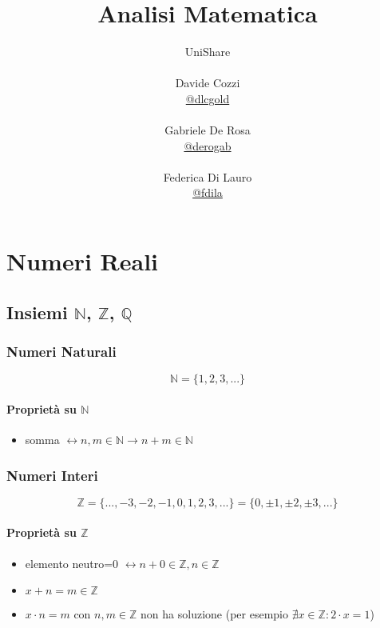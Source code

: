 \documentclass[a4paper,12pt, oneside]{book}
\title{Analisi Matematica}
\author{UniShare\\\\Davide Cozzi\\\href{https://t.me/dlcgold}{@dlcgold}\\\\Gabriele De Rosa\\\href{https://t.me/derogab}{@derogab} \\\\Federica Di Lauro\\\href{https://t.me/f_dila}{@f\textunderscore dila}}
\date{}
\begin{document}
\maketitle


\newtheorem{teorema}{Teorema}
\newtheorem{definizione}{Definizione}
\newtheorem{esempio}{Esempio}
\newtheorem{corollario}{Corollario}
\newtheorem{lemma}{Lemma}
\newtheorem{osservazione}{Osservazione}
\newtheorem{nota}{Nota}
\tableofcontents
\renewcommand{\chaptermark}[1]{%
\markboth{\chaptername
\ \thechapter.\ #1}{}}
\renewcommand{\sectionmark}[1]{\markright{\thesection.\ #1}}

\chapter{Numeri Reali}
\section{Insiemi $\mathbb{N}$, $\mathbb{Z}$, $\mathbb{Q}$}
\subsection{Numeri Naturali}
\begin{equation}
	\mathbb{N}=\{1,2,3,...\}
\end{equation}
\subsubsection{Proprietà su $\mathbb{N}$}
\begin{itemize}
\item somma $\longleftrightarrow n,m \in \mathbb{N} \rightarrow  n+m \in \mathbb{N}$
\end{itemize}
\subsection{Numeri Interi}
\begin{equation}
	\mathbb{Z}=\{...,-3,-2,-1,0,1,2,3,...\}=\{0,\pm 1,\pm 2,\pm 3,...\}
\end{equation}
\subsubsection{Proprietà su $\mathbb{Z}$}
\begin{itemize}
\item elemento neutro=0 $\longleftrightarrow n+0 \in \mathbb{Z}, n\in \mathbb{Z}$
\item $x+n=m \in \mathbb{Z}$
\item $x \cdot n=m\mbox{ con }n,m\in\mathbb{Z}$ non ha soluzione (per esempio $\nexists x\in \mathbb{Z}: 2\cdot x=1$)
\end{itemize}
\newpage
\end{document}
